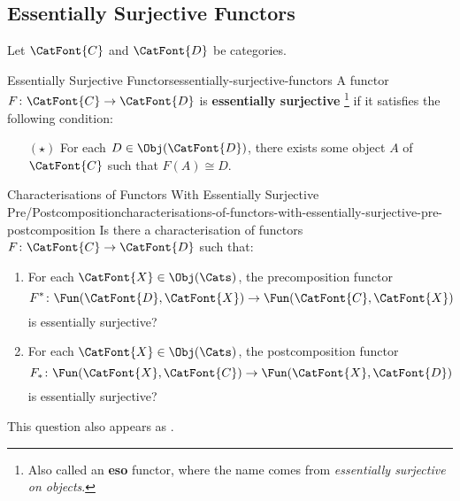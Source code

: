 \subsection{Essentially Surjective Functors}\label{subsection-essentially-surjective-functors}
Let $\CatFont{C}$ and $\CatFont{D}$ be categories.
\begin{definition}{Essentially Surjective Functors}{essentially-surjective-functors}%
    A functor $F\colon\CatFont{C}\to\CatFont{D}$ is \textbf{essentially surjective}%
    \footnote{%
        Also called an \textbf{eso} functor, where the name  comes from \emph{essentially surjective on objects}.
        \par\vspace*{-1.75\baselineskip}
    } %
    if it satisfies the following condition:
    \begin{itemize}%
        \item[$(\star)$]For each $D\in\Obj(\CatFont{D})$, there exists some object $A$ of $\CatFont{C}$ such that $F(A)\cong D$.
    \end{itemize}%
\end{definition}
\begin{question}{Characterisations of Functors With Essentially Surjective Pre/Postcomposition}{characterisations-of-functors-with-essentially-surjective-pre-postcomposition}%
    Is there a characterisation of functors $F\colon\CatFont{C}\to\CatFont{D}$ such that:
    \begin{enumerate}
        \item\label{characterisations-of-functors-with-essentially-surjective-pre-postcomposition-a}For each $\CatFont{X}\in\Obj(\Cats)$, the precomposition functor
            \[
                F^{*}%
                \colon%
                \Fun(\CatFont{D},\CatFont{X})%
                \to%
                \Fun(\CatFont{C},\CatFont{X})%
            \]%
            is essentially surjective?
        \item\label{characterisations-of-functors-with-essentially-surjective-pre-postcomposition-b}For each $\CatFont{X}\in\Obj(\Cats)$, the postcomposition functor
            \[
                F_{*}%
                \colon%
                \Fun(\CatFont{X},\CatFont{C})%
                \to%
                \Fun(\CatFont{X},\CatFont{D})%
            \]%
            is essentially surjective?
    \end{enumerate}
    This question also appears as \cite{MO468125}.
\end{question}
